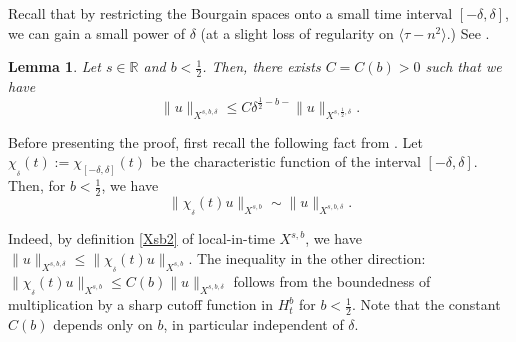 \documentclass[11pt]{amsart}
\newtheorem{lemma}[theorem]{Lemma}
\numberwithin{equation}{section} \numberwithin{theorem}{section}
\begin{document}
Recall that by restricting the Bourgain spaces onto a small time interval $[-{\delta}, {\delta}]$, we can gain a small power of ${\delta}$ (at a slight loss of regularity on ${\langle {\tau - n^2} \rangle} $.) See \cite{Bourgain:1993p453}.
\begin{lemma}
	\label{LEM:timedecay} Let $s \in{\mathbb{R}}$ and $b < \frac{1}{2}$. Then, there exists $C = C(b) > 0$ such that  we have 
	\begin{equation}
		\label{CCtime0}
		 \|u\|_{X^{s, b, {\delta}}}  \leq C {\delta}^{\frac{1}{2}-b-} \|u\|_{X^{s, \frac{1}{2}, {\delta}}}. 
	\end{equation}
\end{lemma}

{
\noindent}
Before presenting the proof, first recall the following fact from \cite{BOPCMI}.
Let $\chi_{_{\delta}} (t):= \chi_{[-{\delta}, {\delta}]}(t)$ be the characteristic function of the interval $[-{\delta}, {\delta}]$.
Then, for $b< \frac{1}{2}$, we have
\begin{equation} \label{CC00}
\|\chi_{_{\delta}}(t) u \|_{X^{s, b}} \sim \|u\|_{X^{s, b, {\delta}}}.
\end{equation}

{
\noindent}
Indeed, by definition \eqref{Xsb2} of local-in-time $X^{s, b}$, 
we have $ \|u\|_{X^{s, b, {\delta}}} \leq \|\chi_{_{\delta}}(t) u \|_{X^{s, b}}$.
The inequality in the other direction:
$ \|\chi_{_{\delta}}(t) u \|_{X^{s, b}} \leq C(b) \|u\|_{X^{s, b, {\delta}}} $
follows from the boundedness of multiplication by 
a sharp cutoff function
in $H^b_t$ for $b < \frac{1}{2}$.
Note that the constant $C(b)$ depends only on $b$,
in particular independent of ${\delta}$.
\end{document}
